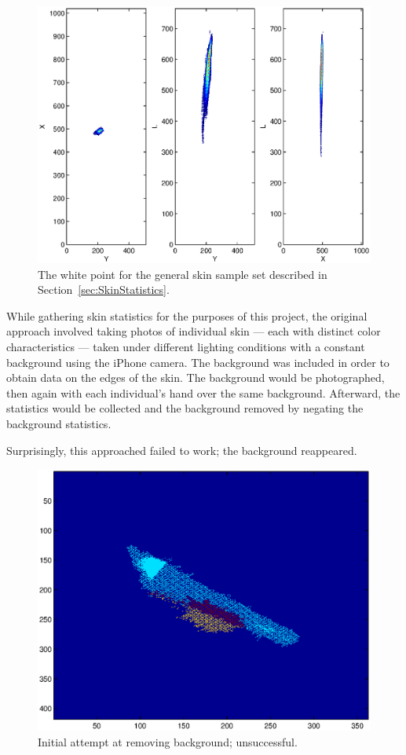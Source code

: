 \begin{figure}[h!]
  \caption{The white point for the general skin sample set described in Section~\ref{sec:SkinStatistics}.}
  \label{fig:WhitePoint}
  \centering
    \includegraphics[width=\textwidth]{Chapter2/Figs/lxy_general_white_point.eps}
\end{figure}

While gathering skin statistics for the purposes of this project, the original approach involved taking photos of individual skin --- each with distinct color characteristics --- taken under different lighting conditions with a constant background using the iPhone camera. The background was included in order to obtain data on the edges of the skin. The background would be photographed, then again with each individual's hand over the same background. Afterward, the statistics would be collected and the background removed by negating the background statistics.

Surprisingly, this approached failed to work; the background reappeared.

\begin{figure}[h!]
  \caption{Initial attempt at removing background; unsuccessful.}
  \label{fig:BGFailure}
  \centering
    \includegraphics[width=\textwidth]{Chapter2/Figs/xy_bg_failed.eps}
\end{figure}

